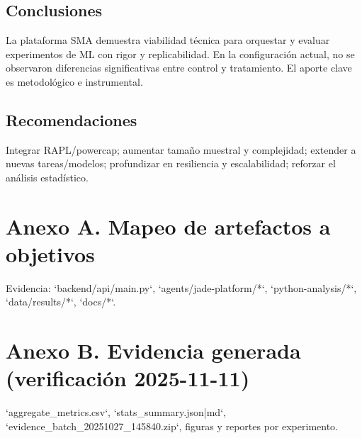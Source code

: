 \documentclass[12pt,oneside]{report}
\begin{document}
\section{Conclusiones}
La plataforma SMA demuestra viabilidad técnica para orquestar y evaluar experimentos de ML con rigor y replicabilidad. En la configuración actual, no se observaron diferencias significativas entre control y tratamiento. El aporte clave es metodológico e instrumental.
\section{Recomendaciones}
Integrar RAPL/powercap; aumentar tamaño muestral y complejidad; extender a nuevas tareas/modelos; profundizar en resiliencia y escalabilidad; reforzar el análisis estadístico.

\appendix
\chapter{Anexo A. Mapeo de artefactos a objetivos}
Evidencia: `backend/api/main.py`, `agents/jade-platform/*`, `python-analysis/*`, `data/results/*`, `docs/*`.
\chapter{Anexo B. Evidencia generada (verificación 2025-11-11)}
`aggregate_metrics.csv`, `stats_summary.json|md`, `evidence_batch_20251027_145840.zip`, figuras y reportes por experimento.
\end{document}
